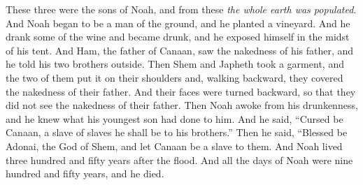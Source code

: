 \begin{biblechapter}
\verse These three were the sons of Noah, and from these \textit{the whole earth was populated}.
\verse And Noah began to be a man of the ground, and he planted a vineyard.
\verse And he drank some of the wine and became drunk, and he exposed himself in the midst of his tent.
\verse And Ham, the father of Canaan, saw the nakedness of his father, and he told his two brothers outside.
\verse Then Shem and Japheth took a garment, and the two of them put it on their shoulders and, walking backward, they covered the nakedness of their father. And their faces were turned backward, so that they did not see the nakedness of their father.
\verse Then Noah awoke from his drunkenness, and he knew what his youngest son had done to him.
\verse And he said, “Cursed be Canaan, 
a slave of slaves he shall be to his brothers.”
\verse Then he said,
\verse “Blessed be Adonai, the God of Shem, 
and let Canaan be a slave to them.
\verse And Noah lived three hundred and fifty years after the flood.
\verse And all the days of Noah were nine hundred and fifty years, and he died.
\end{biblechapter}

